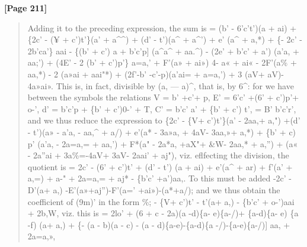 \documentclass[11pt,a4paper]{book}
\begin{document}
\textbf{[Page 211]}\\[0.2cm]
\begin{quote}
Adding it to the preceding expression, the sum is
= (b' - 6'c't')(a + ai) + \{2c' - (¥ + c')t'\}(a' + a\textasciicircum{}\textasciicircum{}) + (d' - t')(a\textasciicircum{} + a\textasciicircum{}') + e' (a\textasciicircum{} + a,*)
+ \{- 2c' - 2b'ca'\} aai - \{(b' + c') a + b'c'p] (a\textasciicircum{}a\textasciicircum{} + aa.\textasciicircum{}) - (2e' + b'c' + a') (a'a, + aa;')
+ (4E' - 2 (b' + c')p'\} a=a,'
+ F'(a» + ai») 4- a« + ai«
- 2F'(a\% + aa,*) - 2 (a»ai + aai"*)
+ (2f'-b' -c'-p)(a'ai= + a=a,') + 3 (aV+ aV)- 4a»ai».
This is, in fact, divisible by (a, --- a)\textasciicircum{}, that is, by 6\textasciicircum{}: for we have between the symbols the
relations
V =
b'
+c'+
p,
E' = 6'c' +(6' + c')p'+ o-',
d' = b'c'p + \{b' + c')0-' + T,
C' = b'c' a' + \{b' + c') t',
=
B' b'c'r',
and we thus reduce the expression to
\{2c' - \{V+ c')t'\}(a' - 2aa,+ a,") +(d' - t')(a» - a'a, - aa,\textasciicircum{} + a/)
+ e'(a* - 3a»a, + 4aV- 3aa,»+ a,*) + \{b' + c) p' (a'a, - 2a=a,= + aa,')
+ F*(a" - 2a*a, +aX"+ \&W- 2aa,* + a,'')
+ (a« - 2a''ai + 3a\%=-4aV+ 3aV- 2aai' + aj"),
viz. eflfecting the division, the quotient is
= 2c' - (6' + c')t' + (d' - t') (a + ai) + e'(a\textasciicircum{} + ar) + f'(a' + a,=) + a-" + 2a=a,= + aj* - \{b'c' +a')aa,.
To this must be added
-2c' -D'(a+ a,) -E'(a»+aj'')-F'(a=' +ai»)-(a*+a/);
and we thus obtain the coefficient of (9m)' in the form
\%; - \{V+ c')t' - t'(a+ a,) - \{b'c' + o-')aai + 2b,W,
viz. this is
= 2lo' + (6 + c - 2a)(a -d)\{a- e)\{a-/)+ \{a-d)\{a- e) \{a -f) (a+ a,)
+ \{- (a - b)(a - c) - (a - d)\{a-e)-\{a-d)\{a -/)-\{a-e)\{a-/)] aa, + 2a=a,»,
\end{quote}
\end{document}

